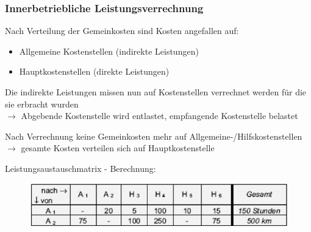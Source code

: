 \documentclass[a4paper,11pt, twoside]{article}
\begin{document}
\subsubsection*{Innerbetriebliche Leistungsverrechnung}
Nach Verteilung der Gemeinkosten sind Kosten angefallen auf:
\begin{itemize}
	\item Allgemeine Kostenstellen (indirekte Leistungen)
	\item Hauptkostenstellen (direkte Leistungen)
\end{itemize}

Die indirekte Leistungen missen nun auf Kostenstellen verrechnet werden für die sie erbracht wurden\\
$\rightarrow$ Abgebende Kostenstelle wird entlastet, empfangende Kostenstelle belastet

Nach Verrechnung keine Gemeinkosten mehr auf Allgemeine-/Hilfskostenstellen\\
$\rightarrow$ gesamte Kosten verteilen sich auf Hauptkostenstelle

Leistungsaustauschmatrix - Berechnung:

\begin{figure}[h]
 \begin{center}
   \includegraphics[scale=0.5]{bilder/leistungsaustauschmatrix.png}
 \end{center}
\end{figure}
\end{document}
